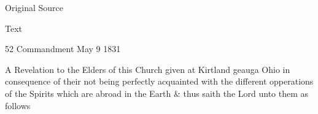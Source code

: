 			\begin{description}
				\item[Original Source]
			\end{description}
			
			
			\begin{description}
				\item[Text]
			\end{description}
			
				\begin{tightcenter}
				52 Commandment May 9 1831
				\end{tightcenter}
				
				A Revelation to the Elders of this Church given at Kirtland geauga Ohio in consequence of their not being perfectly acquainted with the different opperations of the Spirits which are abroad in the Earth \& thus saith the Lord unto them as follows
				
